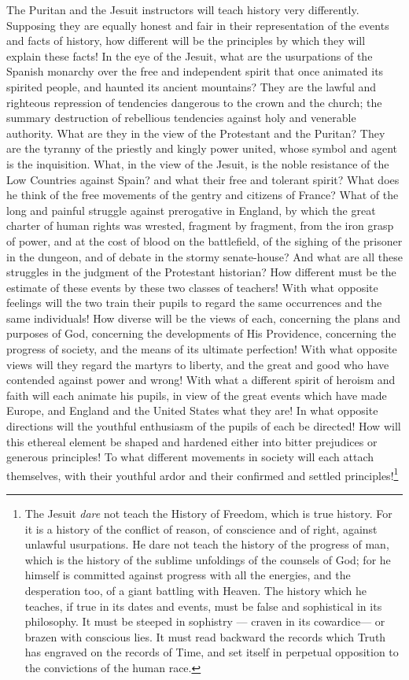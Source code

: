 \documentclass[]{book}
\let\rmarkdownfootnote\footnote%
\def\footnote{\protect\rmarkdownfootnote}
\begin{document}
The Puritan and the Jesuit instructors will teach history very differently. Supposing they are equally honest and fair in their representation of the events and facts of history, how different will be the principles by which they will explain these facts! In the eye of the Jesuit, what are the usurpations of the Spanish monarchy over the free and independent spirit that once animated its spirited people, and haunted its ancient mountains? They are the lawful and righteous repression of tendencies dangerous to the crown and the church; the summary destruction of rebellious tendencies against holy and venerable authority. What are they in the view of the Protestant and the Puritan? They are the tyranny of the priestly and kingly power united, whose symbol and agent is the inquisition. What, in the view of the Jesuit, is the noble resistance of the Low Countries against Spain? and what their free and tolerant spirit? What does he think of the free movements of the gentry and citizens of France? What of the long and painful struggle against prerogative in England, by which the great charter of human rights was wrested, fragment by fragment, from the iron grasp of power, and at the cost of blood on the battlefield, of the sighing of the prisoner in the dungeon, and of debate in the stormy senate-house? And what are all these struggles in the judgment of the Protestant historian? How different must be the estimate of these events by these two classes of teachers! With what opposite feelings will the two train their pupils to regard the same occurrences and the same individuals! How diverse will be the views of each, concerning the plans and purposes of God, concerning the developments of His Providence, concerning the progress of society, and the means of its ultimate perfection! With what opposite views will they regard the martyrs to liberty, and the great and good who have contended against power and wrong! With what a different spirit of heroism and faith will each animate his pupils, in view of the great events which have made Europe, and England and the United States what they are! In what opposite directions will the youthful enthusiasm of the pupils of each be directed! How will this ethereal element be shaped and hardened either into bitter prejudices or generous principles! To what different movements in society will each attach themselves, with their youthful ardor and their confirmed and settled principles!\footnote{The Jesuit \emph{dare} not teach the History of Freedom, which is true history. For it is a history of the conflict of reason, of conscience and of right, against unlawful usurpations. He dare not teach the history of the progress of man, which is the history of the sublime unfoldings of the counsels of God; for he himself is committed against progress with all the energies, and the desperation too, of a giant battling with Heaven. The history which he teaches, if true in its dates and events, must be false and sophistical in its philosophy. It must be steeped in sophistry --- craven in its cowardice--- or brazen with conscious lies. It must read backward the records which Truth has engraved on the records of Time, and set itself in perpetual opposition to the convictions of the human race.}
\end{document}
